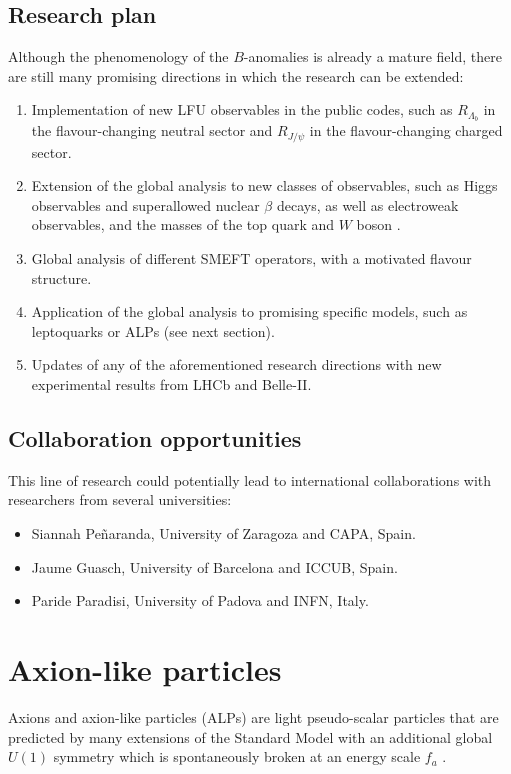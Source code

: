 \documentclass[combined.tex]{subfiles}
\begin{document}
\subsection{Research plan}
Although the phenomenology of the $B$-anomalies is already a mature field, there are still many promising directions in which the research can be extended:
\begin{enumerate}
\item Implementation of new LFU observables in the public codes, such as $R_{\Lambda_b}$ in the flavour-changing neutral sector and $R_{J/\psi}$ in the flavour-changing charged sector.
\item Extension of the global analysis to new classes of observables, such as Higgs observables and superallowed nuclear $\beta$ decays, as well as electroweak observables, and the masses of the top quark and $W$ boson \cite{deBlas:2021wap,deBlas:2022hdk}.
\item Global analysis of different SMEFT operators, with a motivated flavour structure.
\item Application of the global analysis to promising specific models, such as leptoquarks or ALPs (see next section). 
\item Updates of any of the aforementioned research directions with new experimental results from LHCb and Belle-II.
\end{enumerate}

\subsection{Collaboration opportunities}
This line of research could potentially lead to international collaborations with researchers from several universities:
\begin{itemize}
\item Siannah Peñaranda, University of Zaragoza and CAPA, Spain.
\item Jaume Guasch, University of Barcelona and ICCUB, Spain.
\item Paride Paradisi, University of Padova and INFN, Italy.
\end{itemize}

\section{Axion-like particles}
Axions and axion-like particles (ALPs) are light pseudo-scalar particles that are predicted by many extensions of the Standard Model with an additional global $U(1)$ symmetry which is spontaneously broken at an energy scale $f_a$ \cite{Peccei:1977hh,Wilczek:1977pj,Weinberg:1977ma}. 
\end{document}
